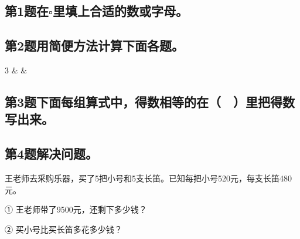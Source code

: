 \subsection*{第1题\quad 在$\square$里填上合适的数或字母。}
\subsection*{第2题\quad 用简便方法计算下面各题。}
\begin{QuestionGrid}{3}
&
&
\\
\end{QuestionGrid}
\subsection*{第3题\quad 下面每组算式中，得数相等的在（　）里把得数写出来。}
\subsection*{第4题\quad 解决问题。}
\noindent 王老师去采购乐器，买了5把小号和5支长笛。已知每把小号520元，每支长笛480元。\par
\smallskip
\noindent ① 王老师带了9500元，还剩下多少钱？\par
{}
\noindent ② 买小号比买长笛多花多少钱？\par
{}
